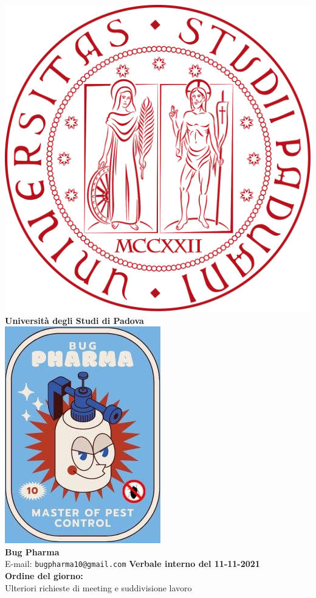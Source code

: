 \documentclass[11pt]{article}
\begin{document}
	\thispagestyle{empty}
	\begin{titlepage}
		\begin{center}
			\includegraphics[scale = 0.05]{../../logo_unipd.png}\\
			\large \textbf{Università degli Studi di Padova} \\
			\vfill
			\includegraphics[scale = 0.7]{../../logo_small.jpg}\\
			\large \textbf{Bug Pharma} \\
			\vfill
			\large
			E-mail: 
			\texttt{bugpharma10@gmail.com}
			\vfill
			\Huge \textbf{Verbale interno del 11-11-2021}\\
			\vfill
			\large \textbf{Ordine del giorno:} \\
			Ulteriori richieste di meeting e suddivisione lavoro\\
			\vfill
			

\end{center}
\end{titlepage}
\end{document}
